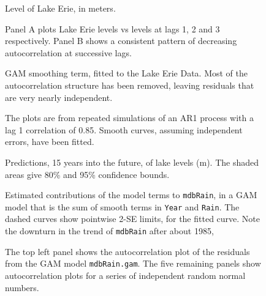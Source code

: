 \documentclass[12pt, a4paper,  BCOR=8.25mm, DIV=15]{scrartcl}\usepackage[]{graphicx}\usepackage[]{color}
\newcommand{\txtt}[1]{{\texttt{#1}}}
\begin{document}
\begin{figure}

\caption{Level of Lake Erie, in meters.
}\label{fig:erie}
\end{figure}

\begin{figure}

\vspace*{-3pt}


\caption{Panel A plots Lake Erie levels vs levels at lags 1, 2 and 3
  respectively. Panel B shows a consistent pattern of decreasing
  autocorrelation at successive lags.
}\label{erie-lagplot}
\end{figure}

\begin{figure}

\caption{GAM smoothing term, fitted to the Lake Erie Data.
    Most of the autocorrelation structure has been
    removed, leaving residuals that are very nearly independent.
  }\label{lh-smoothplot}
\end{figure}

\begin{figure}

\caption{The plots are from repeated simulations of an AR1 process with a
  lag 1 correlation of 0.85.  Smooth curves, assuming independent
  errors, have been fitted.}\label{fig:ar1fits}
\end{figure}

\begin{figure}

\caption{Predictions, 15 years into the future, of lake levels
  (m). The shaded areas give 80\% and 95\% confidence bounds.
}\label{Erie-fcastplot}
\end{figure}

\begin{figure}

  \caption{Estimated contributions of the model terms to
    \txtt{mdbRain}, in a GAM model that is the sum of smooth terms in
    \txtt{Year} and \txtt{Rain}. The dashed curves show pointwise
    2-SE limits, for the fitted curve.  Note the downturn
in the trend of \txtt{mdbRain} after about 1985,}\label{fig:mdbRainSM}
\end{figure}

\begin{figure}

\caption{The top left panel shows the autocorrelation plot of the
  residuals from the GAM model \txtt{mdbRain.gam}.  The five remaining
  panels show autocorrelation plots for a series of independent random
  normal numbers.}\label{fig:ar1sims}
\end{figure}
\end{document}
